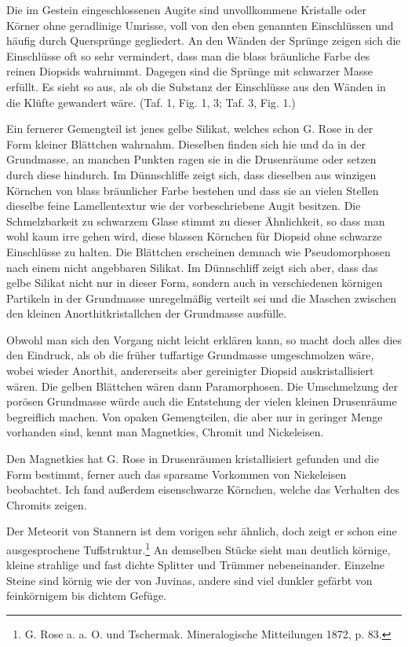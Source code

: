 \documentclass[a4paper, 12pt, oneside]{article}
\begin{document}
Die im Gestein eingeschlossenen Augite sind unvollkommene Kristalle oder Körner ohne geradlinige Umrisse, voll von den eben genannten Einschlüssen und häufig durch Quersprünge gegliedert. An den Wänden der Sprünge zeigen sich die Einschlüsse oft so sehr vermindert, dass man die blass bräunliche Farbe des reinen Diopsids wahrnimmt. Dagegen sind die Sprünge mit schwarzer Masse erfüllt. Es sieht so aus, als ob die Substanz der Einschlüsse aus den Wänden in die Klüfte gewandert wäre. (Taf. 1, Fig. 1, 3; Taf. 3, Fig. 1.)

Ein fernerer Gemengteil ist jenes gelbe Silikat, welches schon G. Rose in der Form kleiner Blättchen wahrnahm. Dieselben finden sich hie und da in der Grundmasse, an manchen Punkten ragen sie in die Drusenräume oder setzen durch diese hindurch. Im Dünnschliffe zeigt sich, dass dieselben aus winzigen Körnchen von blass bräunlicher Farbe bestehen und dass sie an vielen Stellen dieselbe feine Lamellentextur wie der vorbeschriebene Augit besitzen. Die Schmelzbarkeit zu schwarzem Glase stimmt zu dieser Ähnlichkeit, so dass man wohl kaum irre gehen wird, diese blassen Körnchen für Diopsid ohne schwarze Einschlüsse zu halten. Die Blättchen erscheinen demnach wie Pseudomorphosen nach einem nicht angebbaren Silikat. Im Dünnschliff zeigt sich aber, dass das gelbe Silikat nicht nur in dieser Form, sondern auch in verschiedenen körnigen Partikeln in der Grundmasse unregelmäßig verteilt sei und die Maschen zwischen den kleinen Anorthitkristallchen der Grundmasse ausfülle.

Obwohl man sich den Vorgang nicht leicht erklären kann, so macht doch alles dies den Eindruck, als ob die früher tuffartige Grundmasse umgeschmolzen wäre, wobei wieder Anorthit, andererseits aber gereinigter Diopsid auskristallisiert wären. Die gelben Blättchen wären dann Paramorphosen. Die Umschmelzung der porösen Grundmasse würde auch die Entstehung der vielen kleinen Drusenräume begreiflich machen. Von opaken Gemengteilen, die aber nur in geringer Menge vorhanden sind, kennt man Magnetkies, Chromit und Nickeleisen.

Den Magnetkies hat G. Rose in Drusenräumen kristallisiert gefunden und die Form bestimmt, ferner auch das sparsame Vorkommen von Nickeleisen beobachtet. Ich fand außerdem eisenschwarze Körnchen, welche das Verhalten des Chromits zeigen.

Der Meteorit von Stannern ist dem vorigen sehr ähnlich, doch zeigt er schon eine ausgesprochene Tuffstruktur.\footnote{G. Rose a. a. O. und Tschermak. Mineralogische Mitteilungen 1872, p. 83.} An demselben Stücke sieht man deutlich körnige, kleine strahlige und fast dichte Splitter und Trümmer nebeneinander. Einzelne Steine sind körnig wie der von Juvinas, andere sind viel dunkler gefärbt von feinkörnigem bis dichtem Gefüge.
\end{document}
